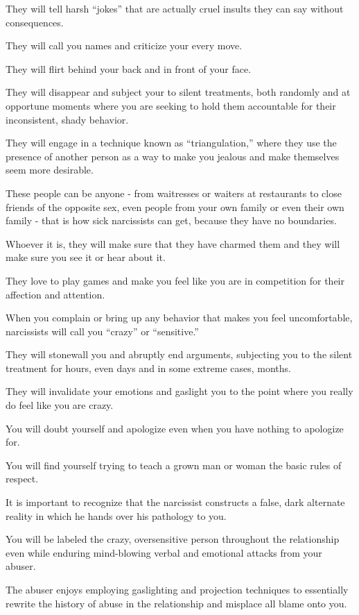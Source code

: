 \documentclass[oneside]{book}
\numberwithin{equation}{section}
\begin{document}
They will tell harsh ``jokes'' that are actually cruel insults they can say without consequences.

They will call you names and criticize your every move.

They will flirt behind your back and in front of your face.

They will disappear and subject your to silent treatments, both randomly and at opportune moments where you are seeking to hold them accountable for their inconsistent, shady behavior.

They will engage in a technique known as ``triangulation,'' where they use the presence of another person as a way to make you jealous and make themselves seem more desirable.

%
These people can be anyone - from waitresses or waiters at restaurants to close friends of the opposite sex, even people from your own family or even their own family - that is how sick narcissists can get, because they have no boundaries.

Whoever it is, they will make sure that they have charmed them and they will make sure you see it or hear about it.

They love to play games and make you feel like you are in competition for their affection and attention.

%
When you complain or bring up any behavior that makes you feel uncomfortable, narcissists will call you ``crazy'' or ``sensitive.''

They will stonewall you and abruptly end arguments, subjecting you to the silent treatment for hours, even days and in some extreme cases, months.

They will invalidate your emotions and gaslight you to the point where you really do feel like you are crazy.

You will doubt yourself and apologize even when you have nothing to apologize for.

You will find yourself trying to teach a grown man or woman the basic rules of respect.

%
It is important to recognize that the narcissist constructs a false, dark alternate reality in which he hands over his pathology to you.

You will be labeled the crazy, oversensitive person throughout the relationship even while enduring mind-blowing verbal and emotional attacks from your abuser.

The abuser enjoys employing gaslighting and projection techniques to essentially rewrite the history of abuse in the relationship and misplace all blame onto you.
\end{document}
